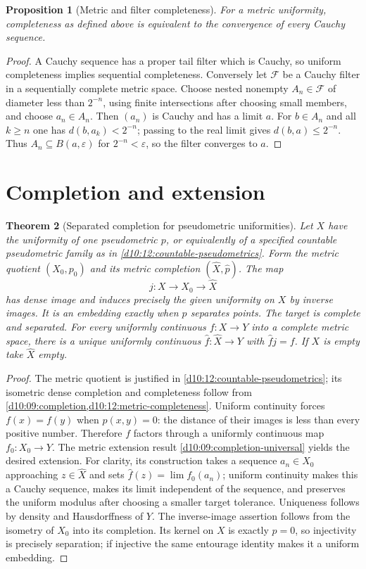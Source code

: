 \documentclass[11pt,oneside,openany]{book}
\newtheorem{theorem}{Theorem}[chapter]
\newtheorem{proposition}[theorem]{Proposition}
\theoremstyle{definition}
\theoremstyle{remark}
\newcommand{\eps}{\varepsilon}
\begin{document}
\begin{proposition}[Metric and filter completeness]\label{d10:12:metric-completeness}
For a metric uniformity, completeness as defined above is equivalent to the convergence of every Cauchy sequence.
\end{proposition}
\begin{proof}
A Cauchy sequence has a proper tail filter which is Cauchy, so uniform completeness implies sequential completeness. Conversely let $\mathcal F$ be a Cauchy filter in a sequentially complete metric space. Choose nested nonempty $A_n\in\mathcal F$ of diameter less than $2^{-n}$, using finite intersections after choosing small members, and choose $a_n\in A_n$. Then $(a_n)$ is Cauchy and has a limit $a$. For $b\in A_n$ and all $k\geq n$ one has $d(b,a_k)<2^{-n}$; passing to the real limit gives $d(b,a)\leq2^{-n}$. Thus $A_n\subseteq B(a,\eps)$ for $2^{-n}<\eps$, so the filter converges to $a$.
\end{proof}

\section{Completion and extension}

\begin{theorem}[Separated completion for pseudometric uniformities]\label{d10:12:pseudometric-completion}
Let $X$ have the uniformity of one pseudometric $p$, or equivalently of a specified countable pseudometric family as in \cref{d10:12:countable-pseudometrics}. Form the metric quotient $(X_0,p_0)$ and its metric completion $(\widehat X,\widehat p)$. The map
\[
 j:X\longrightarrow X_0\longrightarrow\widehat X
\]
has dense image and induces precisely the given uniformity on $X$ by inverse images. It is an embedding exactly when $p$ separates points. The target is complete and separated. For every uniformly continuous $f:X\to Y$ into a complete metric space, there is a unique uniformly continuous $\widehat f:\widehat X\to Y$ with $\widehat f j=f$. If $X$ is empty take $\widehat X$ empty.
\end{theorem}
\begin{proof}
The metric quotient is justified in \cref{d10:12:countable-pseudometrics}; its isometric dense completion and completeness follow from \cref{d10:09:completion,d10:12:metric-completeness}. Uniform continuity forces $f(x)=f(y)$ when $p(x,y)=0$: the distance of their images is less than every positive number. Therefore $f$ factors through a uniformly continuous map $f_0:X_0\to Y$. The metric extension result \cref{d10:09:completion-universal} yields the desired extension. For clarity, its construction takes a sequence $a_n\in X_0$ approaching $z\in\widehat X$ and sets $\widehat f(z)=\lim f_0(a_n)$; uniform continuity makes this a Cauchy sequence, makes its limit independent of the sequence, and preserves the uniform modulus after choosing a smaller target tolerance. Uniqueness follows by density and Hausdorffness of $Y$. The inverse-image assertion follows from the isometry of $X_0$ into its completion. Its kernel on $X$ is exactly $p=0$, so injectivity is precisely separation; if injective the same entourage identity makes it a uniform embedding.
\end{proof}
\end{document}
